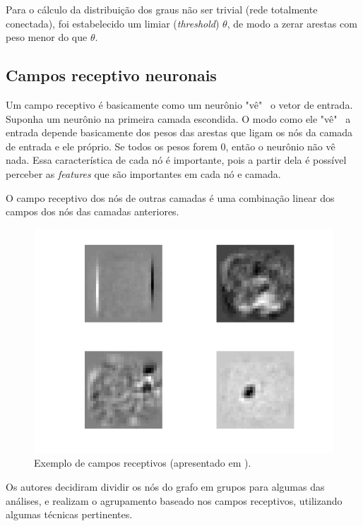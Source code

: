 \documentclass{article}
\begin{document}
        Para o cálculo da distribuição dos graus não ser trivial (rede totalmente conectada), foi estabelecido um limiar (\textit{threshold}) $\theta$, de modo a zerar arestas com peso menor do que $\theta$.

        \subsection{Campos receptivo neuronais}
            \label{field}

            Um campo receptivo é basicamente como um neurônio "vê" \ o vetor de entrada.
            Suponha um neurônio na primeira camada escondida.
            O modo como ele "vê" \ a entrada depende basicamente dos pesos das arestas que ligam os nós da camada de entrada e ele próprio.
            Se todos os pesos forem $0$, então o neurônio não vê nada.
            Essa característica de cada nó é importante, pois a partir dela é possível perceber as \textit{features} que são importantes em cada nó e camada.

            O campo receptivo dos nós de outras camadas é uma combinação linear dos campos dos nós das camadas anteriores.

            \begin{figure}[h!]
                \centering
                \includegraphics[scale=0.2]{Images/Receptive fields.png}
                \caption{Exemplo de campos receptivos (apresentado em \cite{testolin2018deep}).}
                \label{fig5}
            \end{figure}

            Os autores decidiram dividir os nós do grafo em grupos para algumas das análises, e realizam o agrupamento baseado nos campos receptivos, utilizando algumas técnicas pertinentes.
\end{document}
